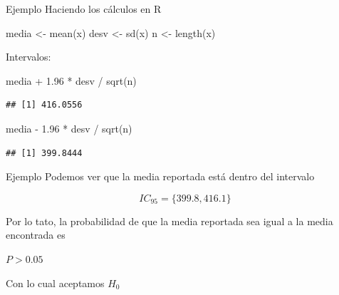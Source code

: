\documentclass[
  11pt,
  ignorenonframetext,
]{beamer}
\newenvironment{Shaded}{}{}
\newcommand{\FloatTok}[1]{\textcolor[rgb]{0.25,0.63,0.44}{#1}}
\newcommand{\FunctionTok}[1]{\textcolor[rgb]{0.02,0.16,0.49}{#1}}
\newcommand{\NormalTok}[1]{#1}
\newcommand{\OtherTok}[1]{\textcolor[rgb]{0.00,0.44,0.13}{#1}}
\newcommand{\SpecialCharTok}[1]{\textcolor[rgb]{0.25,0.44,0.63}{#1}}
\begin{document}
\begin{frame}[fragile]{Ejemplo}
\protect\hypertarget{ejemplo-6}{}
Haciendo los cálculos en R

\begin{Shaded}
\begin{Highlighting}[]
\NormalTok{media }\OtherTok{\textless{}{-}} \FunctionTok{mean}\NormalTok{(x)}
\NormalTok{desv }\OtherTok{\textless{}{-}} \FunctionTok{sd}\NormalTok{(x)}
\NormalTok{n }\OtherTok{\textless{}{-}} \FunctionTok{length}\NormalTok{(x)}
\end{Highlighting}
\end{Shaded}

Intervalos:

\begin{Shaded}
\begin{Highlighting}[]
\NormalTok{media }\SpecialCharTok{+} \FloatTok{1.96} \SpecialCharTok{*}\NormalTok{ desv }\SpecialCharTok{/} \FunctionTok{sqrt}\NormalTok{(n)}
\end{Highlighting}
\end{Shaded}

\begin{verbatim}
## [1] 416.0556
\end{verbatim}

\begin{Shaded}
\begin{Highlighting}[]
\NormalTok{media }\SpecialCharTok{{-}} \FloatTok{1.96} \SpecialCharTok{*}\NormalTok{ desv }\SpecialCharTok{/} \FunctionTok{sqrt}\NormalTok{(n)}
\end{Highlighting}
\end{Shaded}

\begin{verbatim}
## [1] 399.8444
\end{verbatim}
\end{frame}

\begin{frame}{Ejemplo}
\protect\hypertarget{ejemplo-7}{}
Podemos ver que la media reportada está dentro del intervalo

\[IC_{95} = \{399.8, 416.1\}\]

Por lo tato, la probabilidad de que la media reportada sea igual a la
media encontrada es

\(P > 0.05\)

Con lo cual aceptamos \(H_0\)
\end{frame}
\end{document}
